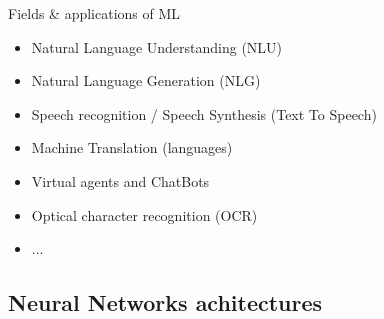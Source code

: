 \documentclass[10pt,serif,mathserif,compress,hyperref={colorlinks}]{beamer}
\begin{document}

\begin{frame}{Fields \& applications of ML}

  \begin{tcolorbox}[title=Natural Language Processing: NLP]
    \begin{itemize}
    \item<1-> Natural Language Understanding (NLU) 
    \item<1-> Natural Language Generation (NLG)
    \item<1-> Speech recognition / Speech Synthesis (Text To Speech)
    \item<1-> Machine Translation (languages)
    \item<1-> Virtual agents and ChatBots
    \item<1-> Optical character recognition (OCR)
    \item<1-> ...
    \end{itemize}
  \end{tcolorbox}   
  
\end{frame}

\subsection{Neural Networks achitectures}

\end{document}
